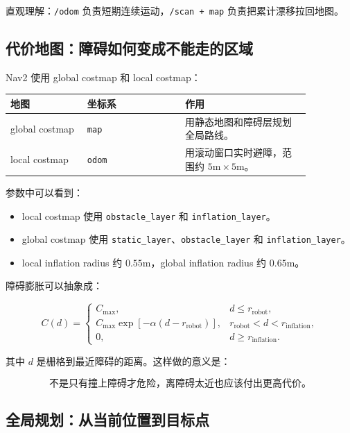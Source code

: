 \documentclass[UTF8,11pt,a4paper]{ctexart}
\begin{document}
直观理解：\texttt{/odom} 负责短期连续运动，\texttt{/scan + map} 负责把累计漂移拉回地图。

\subsection{代价地图：障碍如何变成不能走的区域}

Nav2 使用 global costmap 和 local costmap：

\begin{center}
\renewcommand{\arraystretch}{1.25}
\begin{tabular}{p{0.22\linewidth}p{0.28\linewidth}p{0.36\linewidth}}
\toprule
\textbf{地图} & \textbf{坐标系} & \textbf{作用}\\
\midrule
global costmap & \texttt{map} & 用静态地图和障碍层规划全局路线。\\
local costmap & \texttt{odom} & 用滚动窗口实时避障，范围约 \(5\mathrm m\times5\mathrm m\)。\\
\bottomrule
\end{tabular}
\end{center}

参数中可以看到：

\begin{itemize}
  \item local costmap 使用 \texttt{obstacle\_layer} 和 \texttt{inflation\_layer}。
  \item global costmap 使用 \texttt{static\_layer}、\texttt{obstacle\_layer} 和 \texttt{inflation\_layer}。
  \item local inflation radius 约 \(0.55\mathrm m\)，global inflation radius 约 \(0.65\mathrm m\)。
\end{itemize}

障碍膨胀可以抽象成：

\[
C(d)=
\begin{cases}
C_{\max}, & d\le r_{\mathrm{robot}},\\
C_{\max}\exp[-\alpha(d-r_{\mathrm{robot}})], & r_{\mathrm{robot}}<d<r_{\mathrm{inflation}},\\
0, & d\ge r_{\mathrm{inflation}}.
\end{cases}
\]

其中 \(d\) 是栅格到最近障碍的距离。这样做的意义是：

\[
\boxed{
\text{不是只有撞上障碍才危险，离障碍太近也应该付出更高代价。}
}
\]

\subsection{全局规划：从当前位置到目标点}
\end{document}
